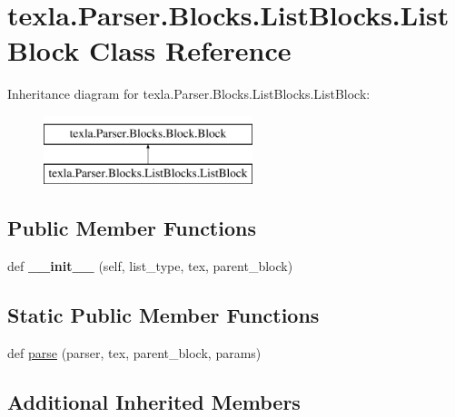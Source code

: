 \hypertarget{classtexla_1_1Parser_1_1Blocks_1_1ListBlocks_1_1ListBlock}{}\section{texla.\+Parser.\+Blocks.\+List\+Blocks.\+List\+Block Class Reference}
\label{classtexla_1_1Parser_1_1Blocks_1_1ListBlocks_1_1ListBlock}
Inheritance diagram for texla.\+Parser.\+Blocks.\+List\+Blocks.\+List\+Block\+:\begin{figure}[H]
\begin{center}
\leavevmode
\includegraphics[height=2.000000cm]{classtexla_1_1Parser_1_1Blocks_1_1ListBlocks_1_1ListBlock}
\end{center}
\end{figure}
\subsection*{Public Member Functions}
\begin{DoxyCompactItemize}
\item 
\hypertarget{classtexla_1_1Parser_1_1Blocks_1_1ListBlocks_1_1ListBlock_a72828e3b10fc6a6c22f6afed383af95e}{}\label{classtexla_1_1Parser_1_1Blocks_1_1ListBlocks_1_1ListBlock_a72828e3b10fc6a6c22f6afed383af95e} 
def {\bfseries \+\_\+\+\_\+init\+\_\+\+\_\+} (self, list\+\_\+type, tex, parent\+\_\+block)
\end{DoxyCompactItemize}
\subsection*{Static Public Member Functions}
\begin{DoxyCompactItemize}
\item 
def \hyperlink{classtexla_1_1Parser_1_1Blocks_1_1ListBlocks_1_1ListBlock_aaf69903ae29fb0d00539f91c6db5a656}{parse} (parser, tex, parent\+\_\+block, params)
\end{DoxyCompactItemize}
\subsection*{Additional Inherited Members}


